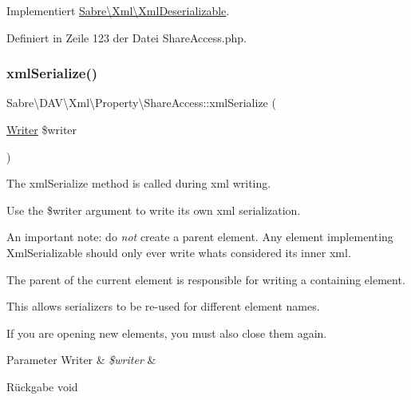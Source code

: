 Implementiert \mbox{\hyperlink{interface_sabre_1_1_xml_1_1_xml_deserializable_a19e0eca545b9a0d93f7d6b69085ade30}{Sabre\textbackslash{}\+Xml\textbackslash{}\+Xml\+Deserializable}}.



Definiert in Zeile 123 der Datei Share\+Access.\+php.

\mbox{\label{class_sabre_1_1_d_a_v_1_1_xml_1_1_property_1_1_share_access_ac1eea445764ba690b291b72db04e16c7}} 
\subsubsection{\texorpdfstring{xml\+Serialize()}{xmlSerialize()}}
{\footnotesize\ttfamily Sabre\textbackslash{}\+D\+A\+V\textbackslash{}\+Xml\textbackslash{}\+Property\textbackslash{}\+Share\+Access\+::xml\+Serialize (\begin{DoxyParamCaption}\item[{\mbox{\hyperlink{class_sabre_1_1_xml_1_1_writer}{Writer}}}]{\$writer }\end{DoxyParamCaption})}

The xml\+Serialize method is called during xml writing.

Use the \$writer argument to write its own xml serialization.

An important note\+: do {\itshape not} create a parent element. Any element implementing Xml\+Serializable should only ever write what\textquotesingle{}s considered its \textquotesingle{}inner xml\textquotesingle{}.

The parent of the current element is responsible for writing a containing element.

This allows serializers to be re-\/used for different element names.

If you are opening new elements, you must also close them again.


\begin{DoxyParams}[1]{Parameter}
Writer & {\em \$writer} & \\
\hline
\end{DoxyParams}
\begin{DoxyReturn}{Rückgabe}
void 
\end{DoxyReturn}


